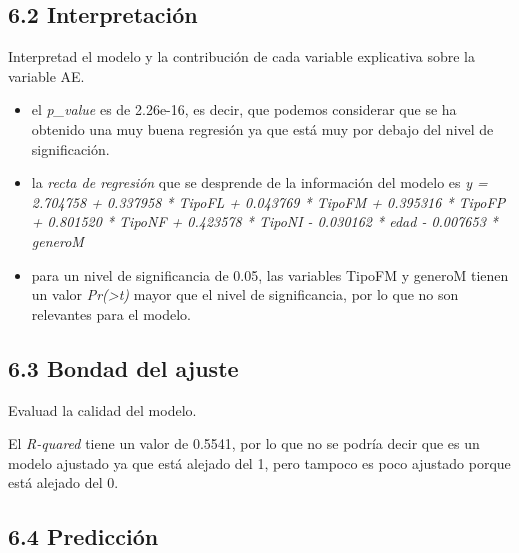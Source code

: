\documentclass[
]{article}
\providecommand{\tightlist}{%
  \setlength{\itemsep}{0pt}\setlength{\parskip}{0pt}}
\begin{document}
\vspace{0.3cm}

\hypertarget{interpretaciuxf3n-1}{%
\subsection{6.2 Interpretación}\label{interpretaciuxf3n-1}}

Interpretad el modelo y la contribución de cada variable explicativa
sobre la variable AE.

\vspace{0.3cm}

\begin{itemize}
\tightlist
\item
  el \emph{p\_value} es de 2.26e-16, es decir, que podemos considerar
  que se ha obtenido una muy buena regresión ya que está muy por debajo
  del nivel de significación.
\item
  la \emph{recta de regresión} que se desprende de la información del
  modelo es \emph{y = 2.704758 + 0.337958 * TipoFL + 0.043769 * TipoFM +
  0.395316 * TipoFP + 0.801520 * TipoNF + 0.423578 * TipoNI - 0.030162 *
  edad - 0.007653 * generoM}
\item
  para un nivel de significancia de 0.05, las variables TipoFM y generoM
  tienen un valor \emph{Pr(\textgreater\textbar t\textbar)} mayor que el
  nivel de significancia, por lo que no son relevantes para el modelo.
\end{itemize}

\newpage

\hypertarget{bondad-del-ajuste}{%
\subsection{6.3 Bondad del ajuste}\label{bondad-del-ajuste}}

Evaluad la calidad del modelo.

\vspace{0.3cm}

El \emph{R-quared} tiene un valor de 0.5541, por lo que no se podría
decir que es un modelo ajustado ya que está alejado del 1, pero tampoco
es poco ajustado porque está alejado del 0.

\vspace{0.3cm}

\hypertarget{predicciuxf3n}{%
\subsection{6.4 Predicción}\label{predicciuxf3n}}
\end{document}

